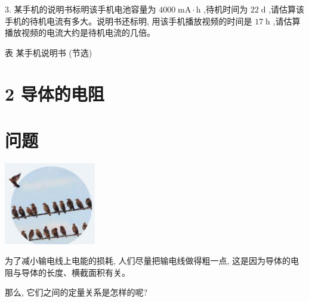 \documentclass[10pt]{article}
\begin{document}
3. 某手机的说明书标明该手机电池容量为 \({4000}\mathrm{\;{mA}} \cdot \mathrm{h}\) ,待机时间为 \({22}\mathrm{\;d}\) ,请估算该手机的待机电流有多大。说明书还标明, 用该手机播放视频的时间是 \({17}\mathrm{\;h}\) ,请估算播放视频的电流大约是待机电流的几倍。

表 某手机说明书 (节选)

\begin{center}
\end{center}

\section*{2 导体的电阻}

\section*{问题}

\begin{center}
\includegraphics[max width=0.3\textwidth]{images/01911d5f-8e38-70c0-b5b8-2b399bd115b6_62_530953.jpg}
\end{center}

为了减小输电线上电能的损耗, 人们尽量把输电线做得粗一点, 这是因为导体的电阻与导体的长度、横截面积有关。

那么, 它们之间的定量关系是怎样的呢?
\end{document}
